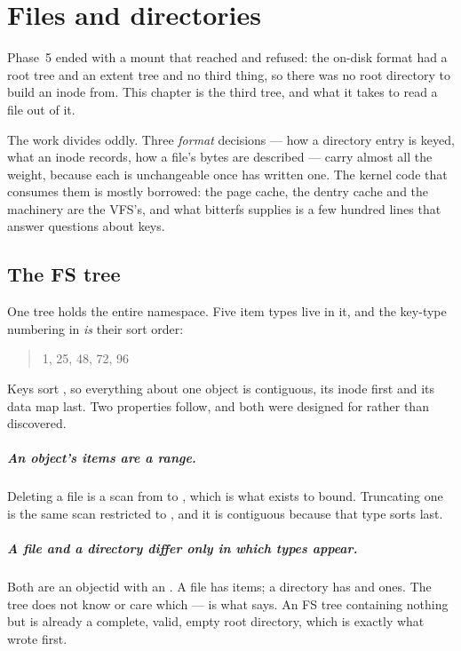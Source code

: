 \chapter{Files and directories}
\label{ch:files}

Phase~5 ended with a mount that reached  and refused: the on-disk
format had a root tree and an extent tree and no third thing, so there was no
root directory to build an inode from. This chapter is the third tree, and what
it takes to read a file out of it.

The work divides oddly. Three \emph{format} decisions --- how a directory entry
is keyed, what an inode records, how a file's bytes are described --- carry
almost all the weight, because each is unchangeable once  has
written one. The kernel code that consumes them is mostly borrowed: the page
cache, the dentry cache and the  machinery are the VFS's, and
what bitterfs supplies is a few hundred lines that answer questions about keys.

\section{The FS tree}

One tree holds the entire namespace. Five item types live in it, and the
key-type numbering in  \emph{is} their sort
order:

\begin{quote}
 1,  25,  48,
 72,  96
\end{quote}

Keys sort , so everything about one object is
contiguous, its inode first and its data map last. Two properties follow, and
both were designed for rather than discovered.

\paragraph{An object's items are a range.} Deleting a file is a scan from
 to , which is what
 exists to bound. Truncating one is the same scan
restricted to , and it is contiguous because that type
sorts last.

\paragraph{A file and a directory differ only in which types appear.} Both are
an objectid with an . A file has 
items; a directory has  and  ones. The
tree does not know or care which ---  is what says. An FS tree
containing nothing but  is already a complete,
valid, empty root directory, which is exactly what  wrote first.

